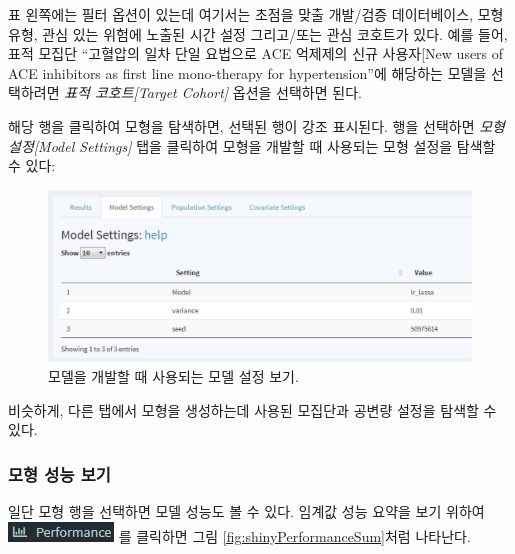 \documentclass[11pt]{book}
\theoremstyle{definition}
\theoremstyle{definition}
\theoremstyle{definition}
\theoremstyle{remark}
\begin{document}
표 왼쪽에는 필터 옵션이 있는데 여기서는 초점을 맞출 개발/검증
데이터베이스, 모형 유형, 관심 있는 위험에 노출된 시간 설정 그리고/또는
관심 코호트가 있다. 예를 들어, 표적 모집단 ``고혈압의 일차 단일 요법으로
ACE 억제제의 신규 사용자{[}New users of ACE inhibitors as first line
mono-therapy for hypertension''에 해당하는 모델을 선택하려면 \emph{표적
코호트{[}Target Cohort{]}} 옵션을 선택하면 된다.

해당 행을 클릭하여 모형을 탐색하면, 선택된 행이 강조 표시된다. 행을
선택하면 \emph{모형 설정{[}Model Settings{]}} 탭을 클릭하여 모형을
개발할 때 사용되는 모형 설정을 탐색할 수 있다:

\begin{figure}

{\centering \includegraphics[width=1\linewidth]{images/PatientLevelPrediction/shiny/shinyModel} 

}

\caption{모델을 개발할 때 사용되는 모델 설정 보기.}\label{fig:shinyModel}
\end{figure}

비슷하게, 다른 탭에서 모형을 생성하는데 사용된 모집단과 공변량 설정을
탐색할 수 있다.

\subsubsection*{모형 성능 보기}\label{--}

일단 모형 행을 선택하면 모델 성능도 볼 수 있다. 임계값 성능 요약을 보기
위하여 \includegraphics{images/PatientLevelPrediction/performance.png}
를 클릭하면 그림 \ref{fig:shinyPerformanceSum}처럼 나타난다.
\end{document}
